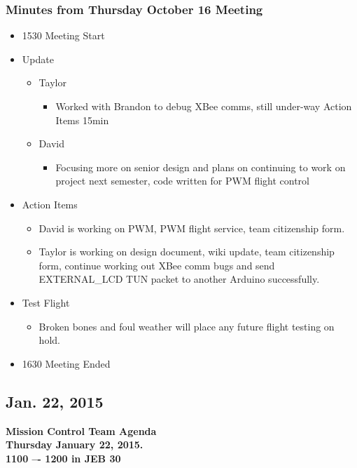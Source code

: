 \documentclass[pdftex,11pt]{article}
\begin{document}
\subsubsection[short]{Minutes from Thursday October 16 Meeting}
\begin{itemize}
	\item 1530 \indent Meeting Start
	\item Update
	\begin{itemize}
		\item Taylor
		\begin{itemize}
			\item Worked with Brandon to debug XBee comms, still under-way Action Items 15min
		\end{itemize}
		\item David
		\begin{itemize}
			\item  Focusing more on senior design and plans on continuing to work on project next semester, code written for PWM flight control
		\end{itemize}
	\end{itemize}
	
	\item Action Items
	\begin{itemize}
		\item David is working on PWM, PWM flight service, team citizenship form.
		\item Taylor is working on design document, wiki update, team citizenship form, continue working out XBee comm bugs and send EXTERNAL\_LCD TUN packet to another Arduino successfully.
	\end{itemize}
	\item Test Flight
	\begin{itemize}
		\item  Broken bones and foul weather will place any future flight testing on hold.
	\end{itemize}
	\item 1630 \indent Meeting Ended
\end{itemize}	

\clearpage


\subsection{Jan. 22, 2015}
{ \huge \bfseries Mission Control Team Agenda \\[0.4cm] }
{ \huge \bfseries Thursday January 22, 2015.\\1100 –-  1200  in JEB 30\\[0.4cm] }
\vspace*{2.5mm}
\end{document}

